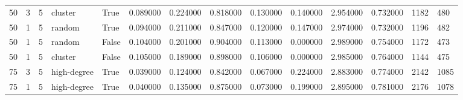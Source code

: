 \begin{table}
\begin{tabular}{llllllllllllll}
50 & 3 & 5 & cluster & True & 0.089000 & 0.224000 & 0.818000 & 0.130000 & 0.140000 & 2.954000 & 0.732000 & 1182 & 480 \\
50 & 1 & 5 & random & True & 0.094000 & 0.211000 & 0.847000 & 0.120000 & 0.147000 & 2.974000 & 0.732000 & 1196 & 482 \\
50 & 1 & 5 & random & False & 0.104000 & 0.201000 & 0.904000 & 0.113000 & 0.000000 & 2.989000 & 0.754000 & 1172 & 473 \\
50 & 1 & 5 & cluster & False & 0.105000 & 0.189000 & 0.898000 & 0.106000 & 0.000000 & 2.985000 & 0.764000 & 1144 & 475 \\
75 & 3 & 5 & high-degree & True & 0.039000 & 0.124000 & 0.842000 & 0.067000 & 0.224000 & 2.883000 & 0.774000 & 2142 & 1085 \\
75 & 1 & 5 & high-degree & True & 0.040000 & 0.135000 & 0.875000 & 0.073000 & 0.199000 & 2.895000 & 0.781000 & 2176 & 1078 \\
\bottomrule
\end{tabular}
\end{table}
